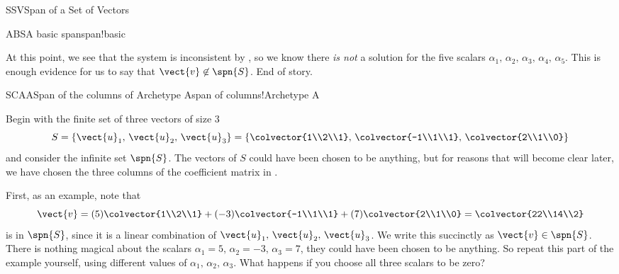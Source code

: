 \begin{subsect}{SSV}{Span of a Set of Vectors}
\begin{example}{ABS}{A basic span}{span!basic}
\begin{para}
\end{para}
%
\begin{para}At this point, we see that the system is inconsistent by , so we know there {\em is not} a solution for the five scalars $\alpha_1,\,\alpha_2,\,\alpha_3,\,\alpha_4,\,\alpha_5$.  This is enough evidence for us to say that $\vect{v}\not\in\spn{S}$.  End of story.\end{para}
%
\end{example}
%
\begin{example}{SCAA}{Span of the columns of Archetype A}{span of columns!Archetype A}
\begin{para}Begin with the finite set of three vectors of size $3$
%
\begin{equation*}
S=\{\vect{u}_1,\,\vect{u}_2,\,\vect{u}_3\}
=\left\{
\colvector{1\\2\\1},\,\colvector{-1\\1\\1},\,\colvector{2\\1\\0}
\right\}
\end{equation*}
%
and consider the infinite set $\spn{S}$.  The vectors of $S$ could have been chosen to be anything, but for reasons that will become clear later, we have chosen the three columns of the coefficient matrix in .\end{para}
%
\begin{para}First, as an example, note that
%
\begin{equation*}
\vect{v}=(5)\colvector{1\\2\\1}+(-3)\colvector{-1\\1\\1}+(7)\colvector{2\\1\\0}=
\colvector{22\\14\\2}
\end{equation*}
%
is in $\spn{S}$, since it is a linear combination of $\vect{u}_1,\,\vect{u}_2,\,\vect{u}_3$.  We write this succinctly as $\vect{v}\in\spn{S}$.  There is nothing magical about the scalars $\alpha_1=5,\,\alpha_2=-3,\,\alpha_3=7$, they could have been chosen to be anything.  So repeat this part of the example yourself, using different values of $\alpha_1,\,\alpha_2,\,\alpha_3$.  What happens if you choose all three scalars to be zero?\end{para}

\end{example}
\end{subsect}

